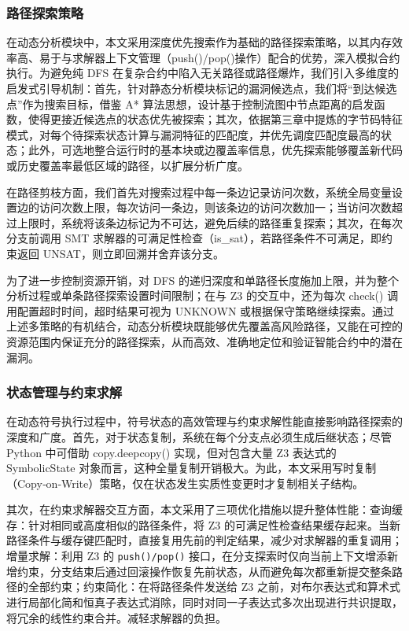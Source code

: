 \documentclass[print, master, vlined, timesmath]{DissertUESTC}
\begin{document}
\subsubsection{路径探索策略}
在动态分析模块中，本文采用深度优先搜索作为基础的路径探索策略，以其内存效率高、易于与求解器上下文管理（push()/pop()操作）配合的优势，深入模拟合约执行。为避免纯 DFS 在复杂合约中陷入无关路径或路径爆炸，我们引入多维度的启发式引导机制：首先，针对静态分析模块标记的漏洞候选点，我们将“到达候选点”作为搜索目标，借鉴 A* 算法思想，设计基于控制流图中节点距离的启发函数，使得更接近候选点的状态优先被探索；其次，依据第三章中提炼的字节码特征模式，对每个待探索状态计算与漏洞特征的匹配度，并优先调度匹配度最高的状态；此外，可选地整合运行时的基本块或边覆盖率信息，优先探索能够覆盖新代码或历史覆盖率最低区域的路径，以扩展分析广度。  

在路径剪枝方面，我们首先对搜索过程中每一条边记录访问次数，系统全局变量设置边的访问次数上限，每次访问一条边，则该条边的访问次数加一；当访问次数超过上限时，系统将该条边标记为不可达，避免后续的路径重复探索；其次，在每次分支前调用 SMT 求解器的可满足性检查（is\_sat），若路径条件不可满足，即约束返回 UNSAT，则立即回溯并舍弃该分支。  

为了进一步控制资源开销，对 DFS 的递归深度和单路径长度施加上限，并为整个分析过程或单条路径探索设置时间限制；在与 Z3 的交互中，还为每次 check() 调用配置超时时间，超时结果可视为 UNKNOWN 或根据保守策略继续探索。通过上述多策略的有机结合，动态分析模块既能够优先覆盖高风险路径，又能在可控的资源范围内保证充分的路径探索，从而高效、准确地定位和验证智能合约中的潜在漏洞。


\subsubsection{状态管理与约束求解}
在动态符号执行过程中，符号状态的高效管理与约束求解性能直接影响路径探索的深度和广度。首先，对于状态复制，系统在每个分支点必须生成后继状态；尽管 Python 中可借助 copy.deepcopy() 实现，但对包含大量 Z3 表达式的 SymbolicState 对象而言，这种全量复制开销极大。为此，本文采用写时复制（Copy‑on‑Write）策略，仅在状态发生实质性变更时才复制相关子结构。

其次，在约束求解器交互方面，本文采用了三项优化措施以提升整体性能：查询缓存：针对相同或高度相似的路径条件，将 Z3 的可满足性检查结果缓存起来。当新路径条件与缓存键匹配时，直接复用先前的判定结果，减少对求解器的重复调用；增量求解：利用 Z3 的 \texttt{push()/pop()} 接口，在分支探索时仅向当前上下文增添新增约束，分支结束后通过回滚操作恢复先前状态，从而避免每次都重新提交整条路径的全部约束；约束简化：在将路径条件发送给 Z3 之前，对布尔表达式和算术式进行局部化简和恒真子表达式消除，同时对同一子表达式多次出现进行共识提取，将冗余的线性约束合并。减轻求解器的负担。
\end{document}
